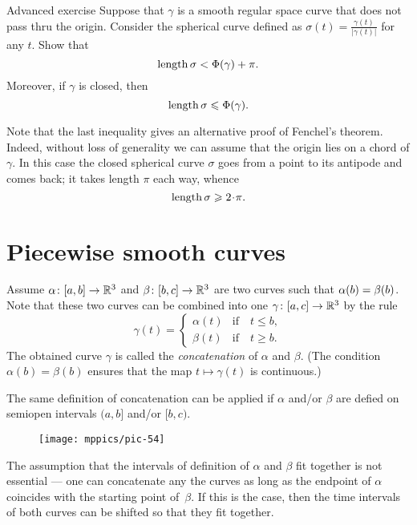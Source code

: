 \begin{thm}{Advanced exercise}\label{ex:gamma/|gamma|}
Suppose that $\gamma$ is a smooth regular space curve that does not pass thru the origin.
Consider the spherical curve defined as $\sigma(t)=\frac{\gamma(t)}{|\gamma(t)|}$ for any $t$.
Show that 
\[\mathop{\rm length}\nolimits \sigma< \Phi({\gamma})+\pi.\]
Moreover, if $\gamma$ is closed, then
\[\mathop{\rm length}\nolimits \sigma\leqslant \Phi({\gamma}).\]
\end{thm}

Note that the last inequality gives an alternative proof of Fenchel's theorem.
Indeed, without loss of generality we can assume that the origin lies on a chord of $\gamma$.
In this case the closed spherical curve $\sigma$ goes from a point to its antipode and comes back; 
it takes length $\pi$ each way, 
whence 
\[\length\sigma\ge 2\cdot\pi.\]



\section{Piecewise smooth curves}



Assume $\alpha\colon[a,b]\to \mathbb{R}^3$ and $\beta\:[b,c]\z\to \RR^3$ are two curves such that $\alpha(b)\z=\beta(b)$.
Note that these two curves can be combined into one $\gamma\:[a,c]\z\to \RR^3$ by the rule 
\[\gamma(t)=
\begin{cases}
\alpha(t)&\text{if}\quad t\le b,
\\
\beta(t)&\text{if}\quad t\ge b.
\end{cases}
\]
The obtained curve $\gamma$ is called the 
\emph{concatenation} of $\alpha$ and $\beta$. %
(The condition $\alpha(b)=\beta(b)$ ensures that the map $t\mapsto\gamma(t)$ is continuous.)

The same definition of concatenation can be applied if $\alpha$ and/or $\beta$ are defied on semiopen intervals 
$(a,b]$ and/or $[b,c)$.

\begin{wrapfigure}{o}{25 mm}
\vskip-0mm
\centering
\texttt{[image: mppics/pic-54]}
\end{wrapfigure}

The assumption that the intervals of definition of $\alpha$ and $\beta$ fit together is not essential --- one can concatenate any the curves as long as the endpoint of $\alpha$ coincides with the starting point of~$\beta$.
If this is the case, then the time intervals of both curves can be shifted so that they fit together. 


